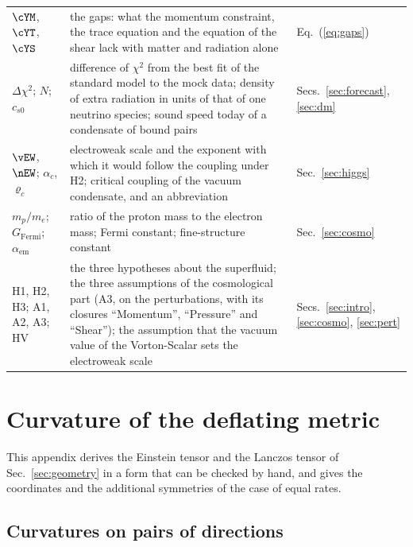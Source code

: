 \begin{table}
\begin{ruledtabular}
\begin{tabular}{p{}p{}p{}}
$\cYM$, $\cYT$, $\cYS$ & the gaps: what the momentum constraint, the trace equation and the equation of the shear lack with matter and radiation alone & Eq.~(\ref{eq:gaps}) \\
$\Delta\chi^{2}$; $N$; $c_{s0}$ & difference of $\chi^{2}$ from the best fit of the standard model to the mock data; density of extra radiation in units of that of one neutrino species; sound speed today of a condensate of bound pairs & Secs.~\ref{sec:forecast}, \ref{sec:dm} \\
$\vEW$, $\nEW$; $\alpha_c$, $\varrho_c$ & electroweak scale and the exponent with which it would follow the coupling under H2; critical coupling of the vacuum condensate, and an abbreviation & Sec.~\ref{sec:higgs} \\
$m_p/m_e$; $G_{\mathrm{Fermi}}$; $\alpha_{\mathrm{em}}$ & ratio of the proton mass to the electron mass; Fermi constant; fine-structure constant & Sec.~\ref{sec:cosmo} \\
H1, H2, H3; A1, A2, A3; HV & the three hypotheses about the superfluid; the three assumptions of the cosmological part (A3, on the perturbations, with its closures ``Momentum'', ``Pressure'' and ``Shear''); the assumption that the vacuum value of the Vorton-Scalar sets the electroweak scale & Secs.~\ref{sec:intro}, \ref{sec:cosmo}, \ref{sec:pert} \\
\end{tabular}
\end{ruledtabular}
\end{table}

\section{Curvature of the deflating metric}
\label{app:curvature}

This appendix derives the Einstein tensor and the Lanczos tensor of Sec.~\ref{sec:geometry} in a
form that can be checked by hand, and gives the coordinates and the additional symmetries of the
case of equal rates.

\subsection{Curvatures on pairs of directions}

